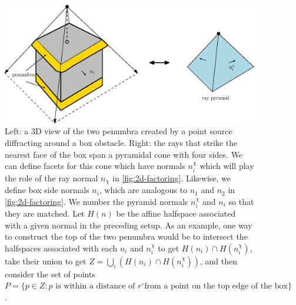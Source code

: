 \documentclass{article}
\begin{document}
\begin{figure}[t]
  \centering
  \includegraphics[width=0.9\linewidth]{zone-types.eps}
  \caption{Left: a 3D view of the two penumbra created by a point
    source diffracting around a box obstacle. Right: the rays that
    strike the nearest face of the box span a pyramidal cone with four
    sides. We can define facets for this cone which have normals
    $n_i^\chi$ which will play the role of the ray normal $n_\chi$ in
    \cref{fig:2d-factoring}. Likewise, we define box side normals
    $n_i$, which are analogous to $n_1$ and $n_2$ in
    \cref{fig:2d-factoring}. We number the pyramid normals $n_i^\chi$
    and $n_i$ so that they are matched. Let $H(n)$ be the affine
    halfspace associated with a given normal in the preceding
    setup. As an example, one way to construct the top of the two
    penumbra would be to intersect the halfspaces associated with each
    $n_i$ and $n^\chi_i$ to get $H(n_i) \cap H(n^\chi_i)$, take their
    union to get $Z = \bigcup_i (H(n_i) \cap H(n^\chi_i))$, and then
    consider the set of points
    $P = \{p \in Z : p \mbox{ is within a distance of } r^\circ \mbox{
      from a point on the top edge of the
      box}\}$.}\label{fig:zone-types}
\end{figure}
\end{document}
